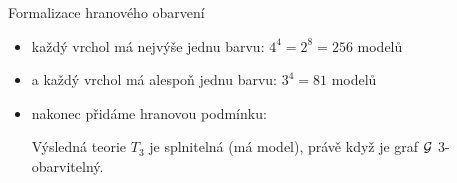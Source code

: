 \documentclass{beamer}
\begin{document}
\begin{frame}{Formalizace hranového obarvení}

    \begin{itemize}
        \item každý vrchol má nejvýše jednu barvu: $4^4=2^8=256$ modelů\medskip


        \medskip

        \item a každý vrchol má alespoň jednu barvu: $3^4=81$ modelů\medskip
        

        \medskip
        

        \medskip

        \item nakonec přidáme \alert{hranovou podmínku}:\medskip
        

        \medskip

        Výsledná teorie \( T_3 \) je \alert{splnitelná} (má model), právě když je graf \( \mathcal{G} \) 3-obarvitelný.   
    \end{itemize}

\end{frame}
\end{document}
